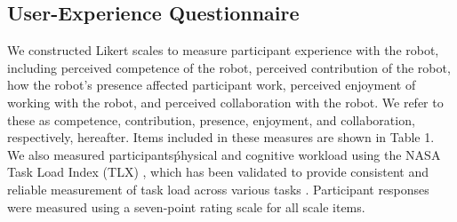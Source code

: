 \subsection{User-Experience Questionnaire}
       We constructed Likert scales to measure participant experience with the robot, including perceived competence of the robot, perceived contribution of the robot, how the robot's presence affected participant work, perceived enjoyment of working with the robot, and perceived collaboration with the robot. We refer to these as competence, contribution, presence, enjoyment, and collaboration, respectively, hereafter. Items included in these measures are shown in Table 1. We also measured participants\' physical and cognitive workload using the NASA Task Load Index (TLX) \cite{hart1988development}, which has been validated to provide consistent and reliable measurement of task load across various tasks \cite{hart2006nasa}. Participant responses were measured using a seven-point rating scale for all scale items.
 
